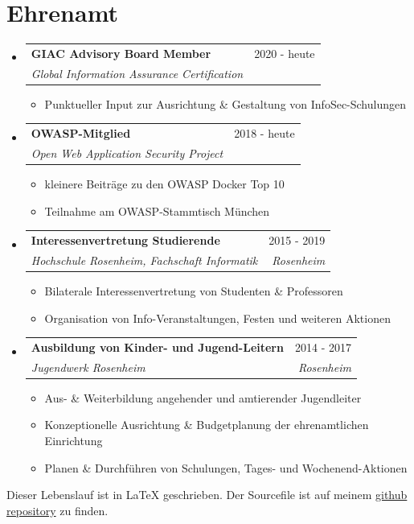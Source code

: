 \documentclass[letterpaper,11pt]{article}
\makeatletter
\newcommand{\resumeItemWithoutHeadline}[1]{
	\item\small{
		{#1 \vspace{-2pt}}
	}
}
\newcommand{\resumeSubheading}[4]{
  \vspace{-1pt}\item
    \begin{tabular*}{0.97\textwidth}[t]{l@{\extracolsep{\fill}}r}
      \textbf{#1} & #2 \\
      \textit{\small#3} & \textit{\small #4} \\
    \end{tabular*}\vspace{-5pt}
}
\newcommand{\resumeSubHeadingListStart}{\begin{itemize}[leftmargin=*]}
\newcommand{\resumeSubHeadingListEnd}{\end{itemize}}
\newcommand{\resumeItemListStart}{\begin{itemize}}
\newcommand{\resumeItemListEnd}{\end{itemize}\vspace{-5pt}}
\makeatother
\begin{document}

\section{Ehrenamt}
  \resumeSubHeadingListStart  
  	
  	\resumeSubheading
  	{GIAC Advisory Board Member}{2020 - heute}
  	{Global Information Assurance Certification}{}
  	\resumeItemListStart
  		\resumeItemWithoutHeadline
  		{Punktueller Input zur Ausrichtung \& Gestaltung von InfoSec-Schulungen}
  	\resumeItemListEnd
  	
  	\resumeSubheading
  	{OWASP-Mitglied}{2018 - heute}
  	{Open Web Application Security Project}{}
  	\resumeItemListStart
  		\resumeItemWithoutHeadline
  		{kleinere Beiträge zu den OWASP Docker Top 10}
  		\resumeItemWithoutHeadline
  		{Teilnahme am OWASP-Stammtisch München}
  	\resumeItemListEnd
  	  
	\resumeSubheading
	{Interessenvertretung Studierende}{2015 - 2019}
	{Hochschule Rosenheim, Fachschaft Informatik}{Rosenheim}
	\resumeItemListStart
		\resumeItemWithoutHeadline
		{Bilaterale Interessenvertretung von Studenten \& Professoren}
		\resumeItemWithoutHeadline
		{Organisation von Info-Veranstaltungen, Festen und weiteren Aktionen}
	\resumeItemListEnd
	
	\resumeSubheading
	{Ausbildung von Kinder- und Jugend-Leitern}{2014 - 2017}
	{Jugendwerk Rosenheim}{Rosenheim}
	\resumeItemListStart
		\resumeItemWithoutHeadline
		{Aus- \& Weiterbildung angehender und amtierender Jugendleiter}
		\resumeItemWithoutHeadline
		{Konzeptionelle Ausrichtung \& Budgetplanung der ehrenamtlichen Einrichtung}
		\resumeItemWithoutHeadline
		{Planen \& Durchführen von Schulungen, Tages- und Wochenend-Aktionen}
	\resumeItemListEnd
	
  \resumeSubHeadingListEnd

\raggedleft 
\tiny{Dieser Lebenslauf ist in LaTeX geschrieben. Der Sourcefile ist auf meinem \href{https://github.com/gramsimamsi/resume/blob/master/lukas_grams_resume.tex}{github repository} zu finden. }
\end{document}
